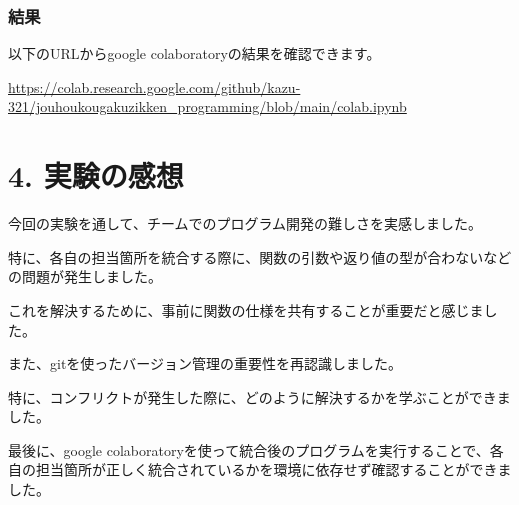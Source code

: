 \documentclass[a4paper,11pt]{jsarticle}
\begin{document}
\subsubsection*{結果}
以下のURLからgoogle colaboratoryの結果を確認できます。

\url{https://colab.research.google.com/github/kazu-321/jouhoukougakuzikken_programming/blob/main/colab.ipynb}

\section*{4. 実験の感想}
今回の実験を通して、チームでのプログラム開発の難しさを実感しました。

特に、各自の担当箇所を統合する際に、関数の引数や返り値の型が合わないなどの問題が発生しました。

これを解決するために、事前に関数の仕様を共有することが重要だと感じました。

また、gitを使ったバージョン管理の重要性を再認識しました。

特に、コンフリクトが発生した際に、どのように解決するかを学ぶことができました。

最後に、google colaboratoryを使って統合後のプログラムを実行することで、各自の担当箇所が正しく統合されているかを環境に依存せず確認することができました。
\end{document}
